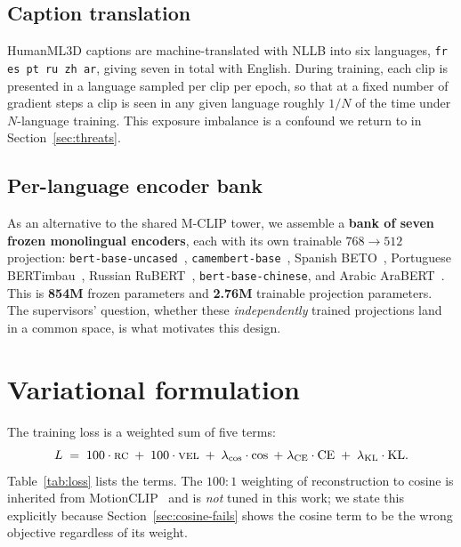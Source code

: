 \documentclass[11pt,a4paper]{report}
\newcommand{\rc}{\textsc{rc}}
\newcommand{\vel}{\textsc{vel}}
\newcommand{\lkl}{\ensuremath{\lambda_{\mathrm{KL}}}}
\begin{document}
\subsection{Caption translation}
HumanML3D captions are machine-translated with NLLB into six languages, \texttt{fr es pt ru zh ar}, giving seven in total with English. During
training, each clip is presented in a language sampled per clip per epoch,
so that at a fixed number of gradient steps a clip is seen in any given
language roughly $1/N$ of the time under $N$-language training. This
exposure imbalance is a confound we return to in
Section~\ref{sec:threats}.

\subsection{Per-language encoder bank}
As an alternative to the shared M-CLIP tower, we assemble a \textbf{bank of
seven frozen monolingual encoders}, each with its own trainable
$768\to512$ projection: \texttt{bert-base-uncased}~\cite{devlin2019bert},
\texttt{camembert-base}~\cite{martin2020camembert}, Spanish
BETO~\cite{canete2020beto}, Portuguese
BERTimbau~\cite{souza2020bertimbau}, Russian
RuBERT~\cite{kuratov2019rubert}, \texttt{bert-base-chinese}, and Arabic
AraBERT~\cite{antoun2020arabert}. This is \textbf{854M} frozen parameters
and \textbf{2.76M} trainable projection parameters. The supervisors'
question, whether these \emph{independently} trained projections land in
a common space, is what motivates this design.

\section{Variational formulation}
\label{sec:loss}

The training loss is a weighted sum of five terms:
\begin{equation}
L \;=\; 100\cdot\rc \;+\; 100\cdot\vel \;+\;
 \lambda_{\cos}\cdot\cos \;+\;
 \lambda_{\mathrm{CE}}\cdot\mathrm{CE} \;+\;
 \lkl\cdot\mathrm{KL}.
\label{eq:loss}
\end{equation}
Table~\ref{tab:loss} lists the terms. The $100{:}1$ weighting of
reconstruction to cosine is inherited from
MotionCLIP~\cite{tevet2022motionclip} and is \emph{not} tuned in this work;
we state this explicitly because Section~\ref{sec:cosine-fails} shows the
cosine term to be the wrong objective regardless of its weight.
\end{document}
